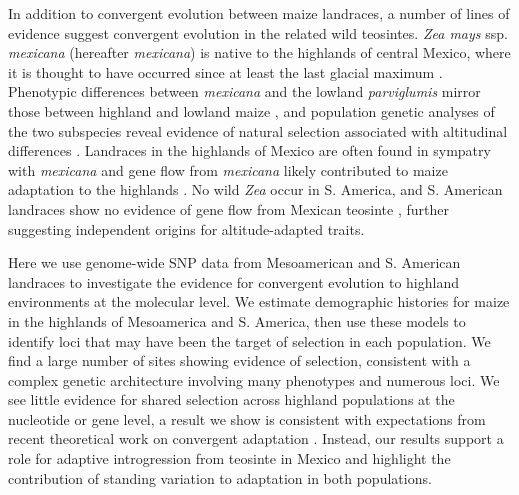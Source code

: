 In addition to convergent evolution between maize landraces, a number of lines of evidence suggest convergent evolution in the related wild teosintes.  
\emph{Zea mays} ssp. \emph{mexicana} (hereafter \emph{mexicana}) is native to the highlands of central Mexico, where it is thought to have occurred since at least the last glacial maximum \cite[]{Ross-Ibarra_2009_19153259, Hufford_niche}. 
Phenotypic differences between \emph{mexicana} and the lowland \emph{parviglumis} mirror those between highland and lowland maize \cite[]{Lauter_2004_15342532}, and population genetic analyses of the two subspecies reveal evidence of natural selection associated with altitudinal differences \cite[]{Pyhajarvi2013,fang2012megabase}.  
Landraces in the highlands of Mexico are often found in sympatry with \emph{mexicana} and gene flow from \emph{mexicana} likely contributed to maize adaptation to the highlands \cite[]{Profford_2013}. 
No wild \emph{Zea} occur in S. America, and S. American landraces show no evidence of gene flow from Mexican teosinte \cite[]{vanHeerwaarden_2011_21189301}, 
further suggesting independent origins for altitude-adapted traits.

Here we use genome-wide SNP data from Mesoamerican and S. American landraces to investigate the evidence for convergent evolution to highland environments at the molecular level.  
We estimate demographic histories for maize in the highlands of Mesoamerica and S. America, then use these models to identify loci that may have been the target of selection in each population.
We find a large number of sites showing evidence of selection, consistent with a complex genetic architecture involving many phenotypes and numerous loci.  
We see little evidence for shared selection across highland populations at the nucleotide or gene level, a result we show is consistent with expectations from recent theoretical work on convergent adaptation \cite[]{ralph2014convergent}.
Instead, our results support a role for adaptive introgression from teosinte in Mexico and highlight the contribution of standing variation to adaptation in both populations.
